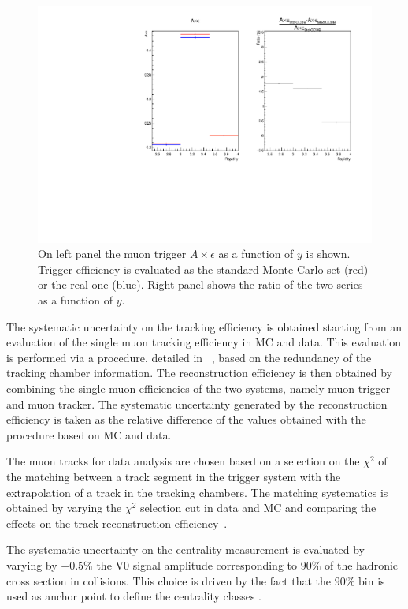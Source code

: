 \begin{figure}[!htb]
\begin{center}
\includegraphics[width=0.9\linewidth]{Chapters/Analysis/Figs/AxEffSystError_NOCUT.pdf}
\caption{On left panel the muon trigger $A\times\epsilon$ as a function of $y$ is shown. Trigger efficiency is evaluated as the standard Monte Carlo set (red) or the real one (blue). Right panel shows the ratio of the two series as a function of $y$.}
\label{fig:trigsystAxe}
\end{center}
\end{figure}

The systematic uncertainty on the tracking efficiency is obtained starting from an evaluation of the single muon tracking efficiency in MC and data. 
This evaluation is performed via a procedure, detailed in ~\cite{Adam:2015isa}, based on the redundancy of the tracking chamber information.
The \upsi reconstruction efficiency is then obtained by combining the single muon efficiencies of the two systems, namely muon trigger and muon tracker.
The systematic uncertainty generated by the \upsi reconstruction efficiency is taken as the relative difference of the values obtained with the procedure based on MC and data.

The muon tracks for data analysis are chosen based on a selection on the $\chi^2$ of the matching between a track segment in the trigger system with the extrapolation of a track in the tracking chambers. 
The matching systematics is obtained by varying the $\chi^2$ selection cut in data and MC and comparing the effects on the track reconstruction efficiency~\cite{Adam:2016rdg}.

The systematic uncertainty on the centrality measurement is evaluated by varying by $\pm0.5\%$ the V0 signal amplitude corresponding to $90\%$ of the hadronic cross section in \pbpb collisions.
This choice is driven by the fact that the $90\%$ bin is used as anchor point to define the centrality classes \cite{PhysRevC.88.044909}.

